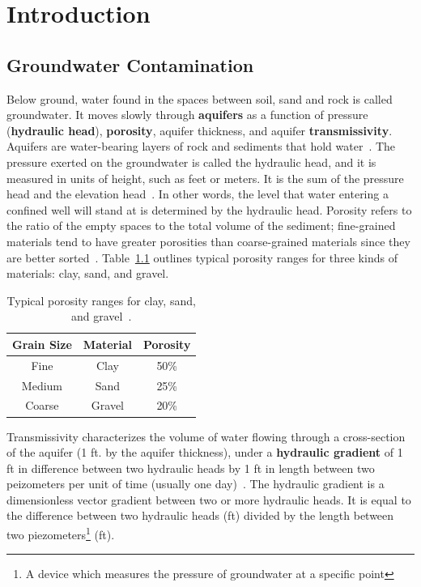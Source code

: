  \chapter{Introduction}
 \label{introchap}
\section{Groundwater Contamination}
Below ground, water found in the spaces between soil, sand and rock
is called groundwater. It moves slowly through
\textbf{aquifers} as a function of pressure (\textbf{hydraulic head}), \textbf{porosity},
aquifer thickness, and aquifer \textbf{transmissivity}. Aquifers are
water-bearing layers of rock and sediments that hold
water~\cite{basics}. The pressure exerted on the groundwater is called
the hydraulic head, and it is measured in units of height, such as
feet or meters. It is the sum of the pressure head and the elevation head~\cite{basics}. In other words,
the level that water entering a confined well will stand at is
determined by the hydraulic head. Porosity refers to the ratio of the empty
spaces to the total volume of the sediment; fine-grained materials tend to
have greater porosities than coarse-grained materials since they are
better sorted~\cite{basics}. Table~\ref{tbl:porosity} outlines typical
porosity ranges for three kinds of materials: clay, sand, and gravel.
\begin {table}[H]
\caption [Typical porosity ranges for clay, sand, and gravel]{Typical
  porosity ranges for clay, sand, and gravel~\cite{basics}.} \label{tbl:porosity}
\begin{center}
    \begin{tabular}{ | c | c | c |}
    \hline
    Grain Size & Material & Porosity \\ \hline
    Fine & Clay  &  50\% \\ \hline
    Medium &  Sand & 25\% \\ \hline
    Coarse &  Gravel &  20\% \\ \hline
    \end{tabular}
\end{center}
\end{table}
\noindent Transmissivity characterizes the volume of water flowing through a
 cross-section of the aquifer (1 ft. by the aquifer thickness), under
 a \textbf{hydraulic gradient} of 1 ft in difference between two
 hydraulic heads by 1 ft in length between two peizometers per unit of time
 (usually one day)~\cite{basics}. The hydraulic gradient is a
 dimensionless vector gradient between two or more hydraulic heads. It
 is equal to the difference between two hydraulic heads (ft) divided by
 the length between two piezometers\footnote{A device which measures the pressure of groundwater at a specific point} (ft). 

